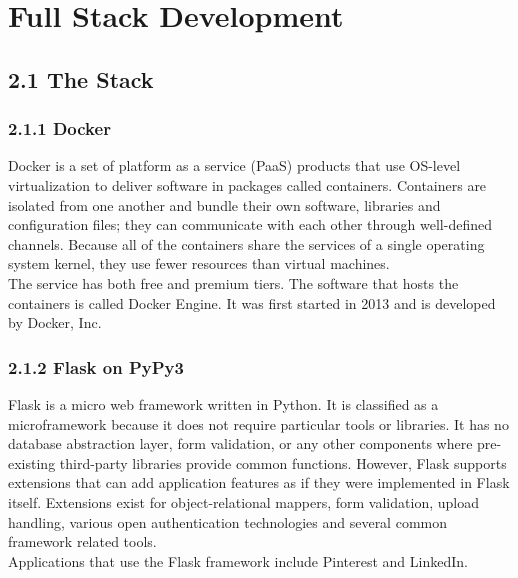 \chapter{Full Stack Development} %


\section*{2.1 \hspace{1cm} The Stack}
\subsection*{2.1.1 \hspace{1cm} Docker}
Docker is a set of platform as a service (PaaS) products that use OS-level virtualization to deliver software in packages called containers. Containers are isolated from one another and bundle their own software, libraries and configuration files; they can communicate with each other through well-defined channels. Because all of the containers share the services of a single operating system kernel, they use fewer resources than virtual machines. \\

The service has both free and premium tiers. The software that hosts the containers is called Docker Engine. It was first started in 2013 and is developed by Docker, Inc.


\subsection*{2.1.2 \hspace{1cm} Flask on PyPy3}
Flask is a micro web framework written in Python. It is classified as a microframework because it does not require particular tools or libraries. It has no database abstraction layer, form validation, or any other components where pre-existing third-party libraries provide common functions. However, Flask supports extensions that can add application features as if they were implemented in Flask itself. Extensions exist for object-relational mappers, form validation, upload handling, various open authentication technologies and several common framework related tools. \\

Applications that use the Flask framework include Pinterest and LinkedIn. \\

